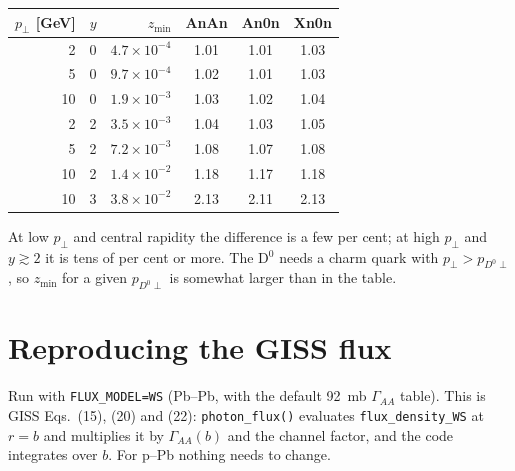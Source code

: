 \documentclass[11pt]{article}
\begin{document}
\begin{center}
\begin{tabular}{rrrccc}
\toprule
$p_\perp$ [GeV] & $y$ & $z_{\min}$ & AnAn & An0n & Xn0n \\
\midrule
 2 & 0 & $4.7\times10^{-4}$ & 1.01 & 1.01 & 1.03 \\
 5 & 0 & $9.7\times10^{-4}$ & 1.02 & 1.01 & 1.03 \\
10 & 0 & $1.9\times10^{-3}$ & 1.03 & 1.02 & 1.04 \\
 2 & 2 & $3.5\times10^{-3}$ & 1.04 & 1.03 & 1.05 \\
 5 & 2 & $7.2\times10^{-3}$ & 1.08 & 1.07 & 1.08 \\
10 & 2 & $1.4\times10^{-2}$ & 1.18 & 1.17 & 1.18 \\
10 & 3 & $3.8\times10^{-2}$ & 2.13 & 2.11 & 2.13 \\
\bottomrule
\end{tabular}
\end{center}

At low $p_\perp$ and central rapidity the difference is a few per cent; at high $p_\perp$ and
$y\gtrsim 2$ it is tens of per cent or more. The D$^0$ needs a charm quark with
$p_\perp > p_{D^0\perp}$, so $z_{\min}$ for a given $p_{D^0\perp}$ is somewhat larger than in the
table.

\section{Reproducing the GISS flux}

Run with \texttt{FLUX\_MODEL=WS} (Pb--Pb, with the default 92~mb $\Gamma_{AA}$ table). This is
GISS Eqs.~(15), (20) and (22): \texttt{photon\_flux()} evaluates
\texttt{flux\_density\_WS} at $r=b$ and multiplies it by $\Gamma_{AA}(b)$ and the channel factor,
and the code integrates over $b$. For p--Pb nothing needs to change.
\end{document}
